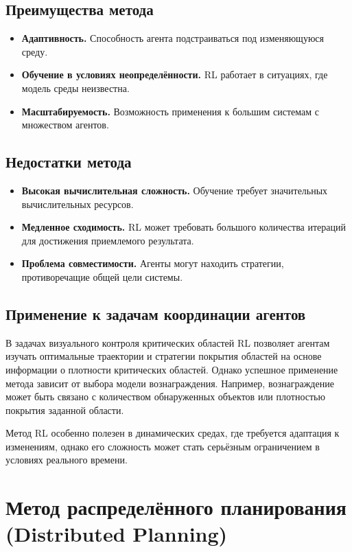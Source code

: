 \subsection{Преимущества метода}

\begin{itemize}
	\item \textbf{Адаптивность.} Способность агента подстраиваться под изменяющуюся среду.
	\item \textbf{Обучение в условиях неопределённости.} RL работает в ситуациях, где модель среды неизвестна.
	\item \textbf{Масштабируемость.} Возможность применения к большим системам с множеством агентов.
\end{itemize}

\subsection{Недостатки метода}

\begin{itemize}
	\item \textbf{Высокая вычислительная сложность.} Обучение требует значительных вычислительных ресурсов.
	\item \textbf{Медленное сходимость.} RL может требовать большого количества итераций для достижения приемлемого результата.
	\item \textbf{Проблема совместимости.} Агенты могут находить стратегии, противоречащие общей цели системы.
\end{itemize}

\subsection{Применение к задачам координации агентов}

В задачах визуального контроля критических областей RL позволяет агентам изучать оптимальные траектории и стратегии покрытия областей на основе информации о плотности критических областей. Однако успешное применение метода зависит от выбора модели вознаграждения. Например, вознаграждение может быть связано с количеством обнаруженных объектов или плотностью покрытия заданной области.

Метод RL особенно полезен в динамических средах, где требуется адаптация к изменениям, однако его сложность может стать серьёзным ограничением в условиях реального времени.

\section{Метод распределённого планирования (Distributed Planning)}

